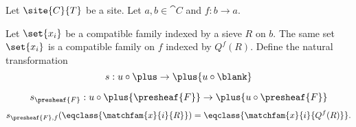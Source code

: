 \begin{definition}
Let $\site{C}{T}$ be a site.
Let $a,b \in \cat{C}$ 
and $f:b\rightarrow a$.

Let $\set{x_i}$ be a compatible family 
indexed by a sieve $R$ on $b$.
The same set $\set{x_i}$ is a compatible family 
on $f$ indexed by $Q^f(R)$.
Define the natural transformation
\[s: u \circ \plus \rightarrow \plus{u\circ \blank}\] 

\[s_{\presheaf{F}}: u \circ \plus{\presheaf{F}} \rightarrow \plus{u \circ \presheaf{F}}\]
\[s_{\presheaf{F},f}(\eqclass{\matchfam{x}{i}{R}}) = \eqclass{\matchfam{x}{i}{Q^f(R)}}.\]
\end{definition}

